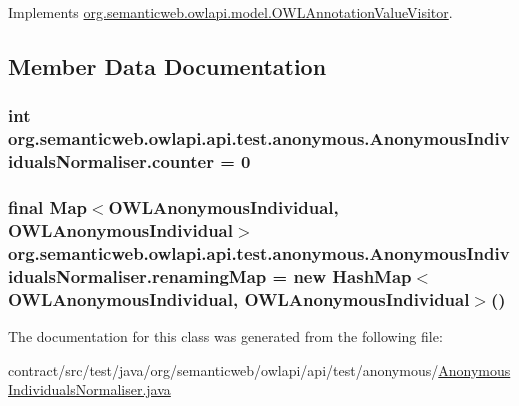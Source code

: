 Implements \hyperlink{interfaceorg_1_1semanticweb_1_1owlapi_1_1model_1_1_o_w_l_annotation_value_visitor_a69e4d89e7e124deb0fc1684361283293}{org.\-semanticweb.\-owlapi.\-model.\-O\-W\-L\-Annotation\-Value\-Visitor}.



\subsection{Member Data Documentation}
\hypertarget{classorg_1_1semanticweb_1_1owlapi_1_1api_1_1test_1_1anonymous_1_1_anonymous_individuals_normaliser_afd55304592af66f4fdff4df588568d06}{
\subsubsection[{counter}]{\setlength{\rightskip}{0pt plus 5cm}int org.\-semanticweb.\-owlapi.\-api.\-test.\-anonymous.\-Anonymous\-Individuals\-Normaliser.\-counter = 0\hspace{0.3cm}{\ttfamily [private]}}}\label{classorg_1_1semanticweb_1_1owlapi_1_1api_1_1test_1_1anonymous_1_1_anonymous_individuals_normaliser_afd55304592af66f4fdff4df588568d06}
\hypertarget{classorg_1_1semanticweb_1_1owlapi_1_1api_1_1test_1_1anonymous_1_1_anonymous_individuals_normaliser_ae07e6f0ba72ae6828e8829a5fa5044be}{
\subsubsection[{renaming\-Map}]{\setlength{\rightskip}{0pt plus 5cm}final Map$<${\bf O\-W\-L\-Anonymous\-Individual}, {\bf O\-W\-L\-Anonymous\-Individual}$>$ org.\-semanticweb.\-owlapi.\-api.\-test.\-anonymous.\-Anonymous\-Individuals\-Normaliser.\-renaming\-Map = new Hash\-Map$<${\bf O\-W\-L\-Anonymous\-Individual}, {\bf O\-W\-L\-Anonymous\-Individual}$>$()\hspace{0.3cm}{\ttfamily [private]}}}\label{classorg_1_1semanticweb_1_1owlapi_1_1api_1_1test_1_1anonymous_1_1_anonymous_individuals_normaliser_ae07e6f0ba72ae6828e8829a5fa5044be}


The documentation for this class was generated from the following file\-:\begin{DoxyCompactItemize}
\item 
contract/src/test/java/org/semanticweb/owlapi/api/test/anonymous/\hyperlink{_anonymous_individuals_normaliser_8java}{Anonymous\-Individuals\-Normaliser.\-java}\end{DoxyCompactItemize}
